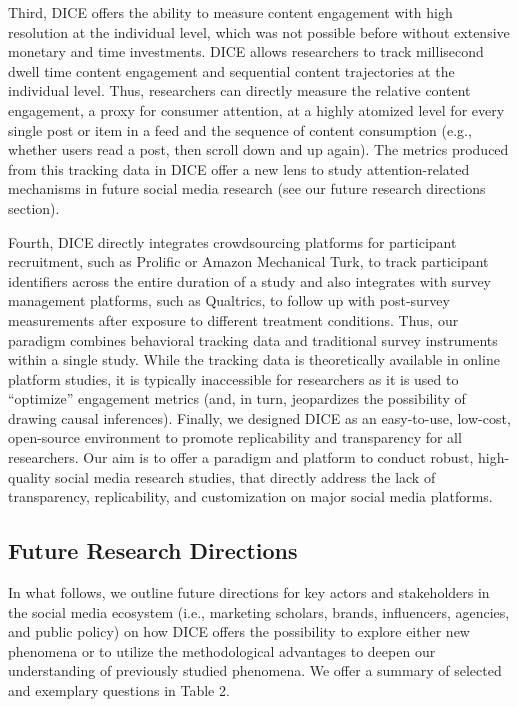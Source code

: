 \documentclass[
  a4paper,
]{scrreprt}
\begin{document}
Third, DICE offers the ability to measure content engagement with high
resolution at the individual level, which was not possible before
without extensive monetary and time investments. DICE allows researchers
to track millisecond dwell time content engagement and sequential
content trajectories at the individual level. Thus, researchers can
directly measure the relative content engagement, a proxy for consumer
attention, at a highly atomized level for every single post or item in a
feed and the sequence of content consumption (e.g., whether users read a
post, then scroll down and up again). The metrics produced from this
tracking data in DICE offer a new lens to study attention-related
mechanisms in future social media research (see our future research
directions section).

Fourth, DICE directly integrates crowdsourcing platforms for participant
recruitment, such as Prolific or Amazon Mechanical Turk, to track
participant identifiers across the entire duration of a study and also
integrates with survey management platforms, such as Qualtrics, to
follow up with post-survey measurements after exposure to different
treatment conditions. Thus, our paradigm combines behavioral tracking
data and traditional survey instruments within a single study. While the
tracking data is theoretically available in online platform studies, it
is typically inaccessible for researchers as it is used to ``optimize''
engagement metrics (and, in turn, jeopardizes the possibility of drawing
causal inferences). Finally, we designed DICE as an easy-to-use,
low-cost, open-source environment to promote replicability and
transparency for all researchers. Our aim is to offer a paradigm and
platform to conduct robust, high-quality social media research studies,
that directly address the lack of transparency, replicability, and
customization on major social media platforms.

\hypertarget{future-research-directions}{%
\subsection{Future Research
Directions}\label{future-research-directions}}

In what follows, we outline future directions for key actors and
stakeholders in the social media ecosystem (i.e., marketing scholars,
brands, influencers, agencies, and public policy) on how DICE offers the
possibility to explore either new phenomena or to utilize the
methodological advantages to deepen our understanding of previously
studied phenomena. We offer a summary of selected and exemplary
questions in Table 2.
\end{document}
